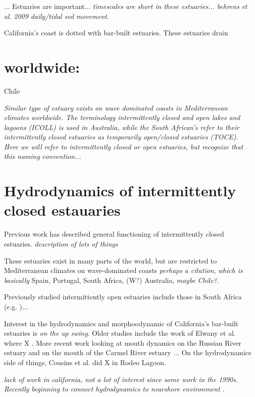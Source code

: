 

... Estuaries are important... 
\emph{timescales are short in these estuaries... behrens et al. 2009 daily/tidal sed movement}.



California's coast is dotted with bar-built estuaries.  These estuaries drain 


\section{worldwide:}
Chile \parencite{dussaillant_water_2009}


\emph{Similar type of estuary exists on wave dominated coasts in Mediterranean climates worldwide. The terminology intermittently closed and open lakes and lagoons (ICOLL) is used in Australia, while the South African's refer to their intermittently closed estuaries as temporarily open/closed estuaries (TOCE).  Here we will refer to intermittently closed or open estuaries, but recognize that this naming convention... }

\section{Hydrodynamics of intermittently closed estauaries}
Previous work has described general functioning of intermittently closed estuaries.  
\emph{description of lots of things}

These estuaries exist in many parts of the world, but are restricted to Mediterranean climates on wave-dominated coasts \emph{perhaps a citation}, \emph{which is basically} Spain, Portugal, South Africa, (W?) Australia, \emph{maybe Chile?}. 

Previously studied intermittently open estuaries include those in South Africa (e.g. \cite{largier_dynamics_1991})...


Interest in the hydrodynamics and morphoodynamic of California's bar-built estuaries is \emph{on the up swing}. Older studies include the work of Elwany et al. where X \cite{elwany_opening_1998}. More recent work looking at mouth dynamics on the Russian River estuary \parencite{behrens_characterization_2009, behrens_episodic_2013} and on the mouth of the Carmel River estuary \parencite{rich_hydrologic_2013}... On the hydrodynamics side of things, Cousins et al. \cite{cousins_hydrodynamics_2011} did X in Rodeo Lagoon. 



\emph{lack of work in california, not a lot of interest since some work in the 1990s.  Recently beginning to connect hydrodynamics to nearshore environment \parencite{dodet_wave-current_2013, uncles_infragravity_2014}.}







